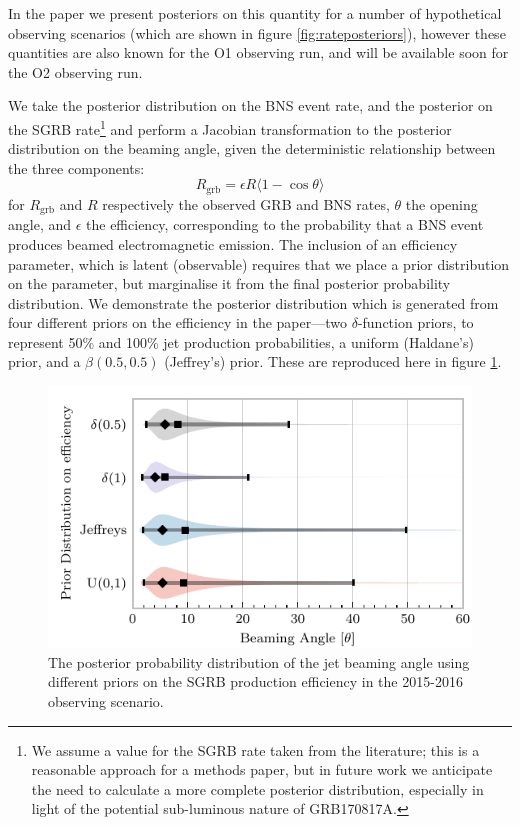 \documentclass{kentigern}
\theoremstyle{definition}
\begin{document}
In the paper we present posteriors on this quantity for a number of
hypothetical observing scenarios (which are shown in figure
\ref{fig:rateposteriors}), however these quantities are also known for
the O1 observing run, and will be available soon for the O2 observing
run.

We take the posterior distribution on the BNS event rate, and the
posterior on the SGRB rate\footnote{We assume a value for the SGRB
  rate taken from the literature; this is a reasonable approach for a
  methods paper, but in future work we anticipate the need to
  calculate a more complete posterior distribution, especially in
  light of the potential sub-luminous nature of GRB170817A.} and
perform a Jacobian transformation to the posterior distribution on the
beaming angle, given the deterministic relationship between the three
components:
\begin{equation}
  \label{eq:sgrb-angle-from-rates}
  R_{\text{grb}} = \epsilon R \langle 1 - \cos\theta \rangle
\end{equation}
for $R_{\text{grb}}$ and $R$ respectively the observed GRB and BNS
rates, $\theta$ the opening angle, and $\epsilon$ the efficiency,
corresponding to the probability that a BNS event produces beamed
electromagnetic emission. The inclusion of an efficiency parameter,
which is latent (observable) requires that we place a prior
distribution on the parameter, but marginalise it from the final
posterior probability distribution. We demonstrate the posterior
distribution which is generated from four different priors on the
efficiency in the paper---two $\delta$-function priors, to represent
50\% and 100\% jet production probabilities, a uniform (Haldane's)
prior, and a $\beta(0.5, 0.5)$ (Jeffrey's) prior. These are reproduced
here in figure \ref{fig:o1posterior}.

\begin{figure}
  \includegraphics{figures/sgrb/O1_beaming_posteriors_violin.pdf}
  \caption{The posterior probability distribution of the jet
    beaming angle using different priors on the SGRB production
    efficiency in the 2015-2016 observing scenario. \label{fig:o1posterior}}
  \end{figure}
\end{document}
